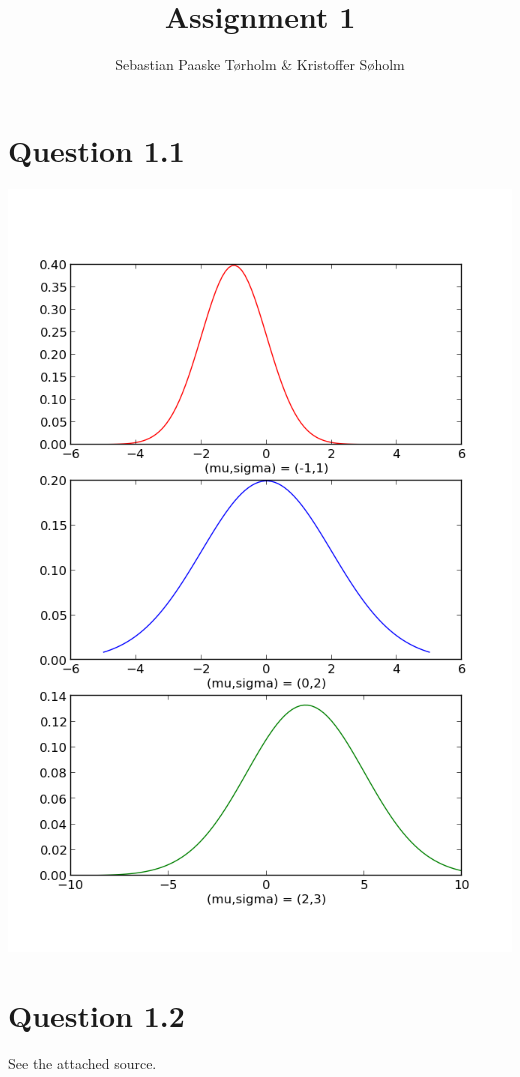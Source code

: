 \documentclass[11pt,a4paper]{article}
\title{Assignment 1}
\author{Sebastian Paaske Tørholm \& Kristoffer Søholm}
\begin{document}
\maketitle

\section{Question 1.1}
\includegraphics[width=1.1\textwidth]{figure_1.png}

\section{Question 1.2}
See the attached source.
\end{document}
